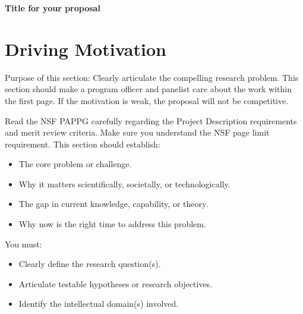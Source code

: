 \documentclass[11pt,letterpaper]{article}
\begin{document}
\setlength{\abovedisplayskip}{3pt}
\setlength{\belowdisplayskip}{3pt}


%


\begin{center}		
{\LARGE \textbf{Title for your proposal}}
\end{center}


\section{Driving Motivation}

Purpose of this section: Clearly articulate the compelling research problem. This section should make a program officer and panelist care about the work within the first page. If the motivation is weak, the proposal will not be competitive.

 Read the NSF PAPPG carefully regarding the Project Description requirements and merit review criteria. Make sure you understand the NSF page limit requirement. This section should establish:
\begin{itemize}
    \item The core problem or challenge.
    \item Why it matters scientifically, societally, or technologically.
    \item The gap in current knowledge, capability, or theory.
    \item Why now is the right time to address this problem.
\end{itemize}

You must:
\begin{itemize}
    \item Clearly define the research question(s).
    \item Articulate testable hypotheses or research objectives.
    \item Identify the intellectual domain(s) involved.
\end{itemize}
\end{document}
